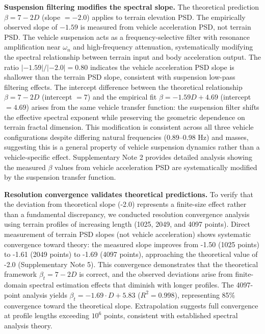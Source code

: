 \documentclass[11pt,letterpaper]{article}
\begin{document}
\textbf{Suspension filtering modifies the spectral slope.} The theoretical prediction $\beta = 7-2D$ (slope $= -2.0$) applies to terrain elevation PSD. The empirically observed slope of $-1.59$ is measured from vehicle acceleration PSD, not terrain PSD. The vehicle suspension acts as a frequency-selective filter with resonance amplification near $\omega_n$ and high-frequency attenuation, systematically modifying the spectral relationship between terrain input and body acceleration output. The ratio $|-1.59|/|-2.0| = 0.80$ indicates the vehicle acceleration PSD slope is shallower than the terrain PSD slope, consistent with suspension low-pass filtering effects. The intercept difference between the theoretical relationship $\beta = 7-2D$ (intercept $= 7$) and the empirical fit $\beta = -1.59D + 4.69$ (intercept $= 4.69$) arises from the same vehicle transfer function: the suspension filter shifts the effective spectral exponent while preserving the geometric dependence on terrain fractal dimension. This modification is consistent across all three vehicle configurations despite differing natural frequencies (0.89--0.98 Hz) and masses, suggesting this is a general property of vehicle suspension dynamics rather than a vehicle-specific effect. Supplementary Note 2 provides detailed analysis showing the measured $\beta$ values from vehicle acceleration PSD are systematically modified by the suspension transfer function.

\textbf{Resolution convergence validates theoretical predictions.} To verify that the deviation from theoretical slope (-2.0) represents a finite-size effect rather than a fundamental discrepancy, we conducted resolution convergence analysis using terrain profiles of increasing length (1025, 2049, and 4097 points). Direct measurement of terrain PSD slopes (not vehicle acceleration) shows systematic convergence toward theory: the measured slope improves from -1.50 (1025 points) to -1.61 (2049 points) to -1.69 (4097 points), approaching the theoretical value of -2.0 (Supplementary Note 5). This convergence demonstrates that the theoretical framework $\beta_t = 7-2D$ is correct, and the observed deviations arise from finite-domain spectral estimation effects that diminish with longer profiles. The 4097-point analysis yields $\beta_t = -1.69 \cdot D + 5.83$ ($R^2 = 0.998$), representing 85\% convergence toward the theoretical slope. Extrapolation suggests full convergence at profile lengths exceeding $10^6$ points, consistent with established spectral analysis theory\cite{Bendat2010}.
\end{document}
